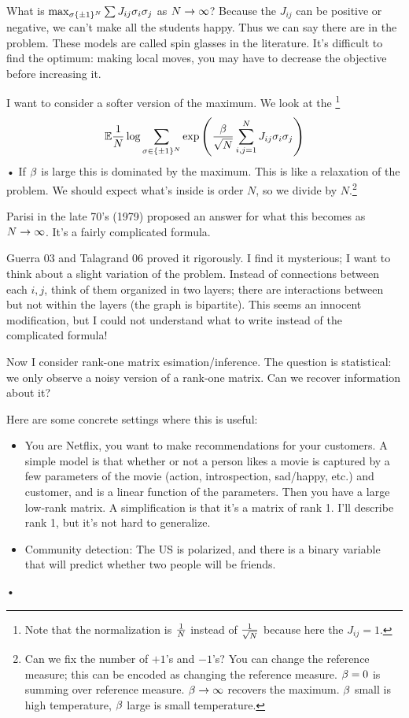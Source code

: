 What is $\max_{\sigma\{\pm 1\}^N} \sum J_{ij}\sigma_i\sigma_j$ as $N\to \infty$?
Because the $J_{ij}$ can be positive or negative, we can't make all the students happy. Thus we can say there are  in the problem. These models are called spin glasses in the literature.
It's difficult to find the optimum: making local moves, you may have to decrease the objective before increasing it.

I want to consider a softer version of the maximum. We look at the \footnote{Note that the normalization is $\frac{1}{N}$ instead of $\frac{1}{\sqrt N}$ because here the $J_{ij}=1$.}
\begin{align*}
\mathbb{E} \frac{1}{N}\log \sum_{\sigma\in \{\pm 1\}^N}\exp\left( {
\frac{\beta}{\sqrt N}\sum_{i,j=1}^{N} J_{ij} \sigma_i\sigma_j
} \right)
\end{align*}•
If $\beta$ is large this is dominated by the maximum. 
This is like a relaxation of the problem. We should expect what's inside is order $N$, so we divide by $N$.\footnote{Can we fix the number of $+1$'s and $-1$'s? You can change the reference measure; this can be encoded as changing the reference measure.
$\beta=0$ is summing over reference measure. $\beta\to \infty$ recovers the maximum. $\beta$ small is high temperature, $\beta$ large is small temperature.}

Parisi in the late 70's (1979) proposed an answer for what this becomes as $N\to \infty$. It's a fairly complicated formula. 

Guerra 03 and Talagrand 06 proved it rigorously. I find it mysterious; I want to think about a slight variation of the problem. Instead of connections between each $i,j$, think of them organized in two layers; there are interactions between but not within the layers (the graph is bipartite). 
This seems an innocent modification, but I could not understand what to write instead of the complicated formula! %


Now I consider rank-one matrix esimation/inference. The question is statistical: we only observe a noisy version of a rank-one matrix. Can we recover information about it?

Here are some concrete settings where this is useful:
\begin{itemize}
\item
You are Netflix, you want to make recommendations for your customers. A simple model is that whether or not a person likes a movie is captured by a few parameters of the movie (action, introspection, sad/happy, etc.) and customer, and is a linear function of the parameters. Then you have a large low-rank matrix. A simplification is that it's a matrix of rank 1. I'll describe rank 1, but it's not hard to generalize. 
\item
Community detection: The US is polarized, and there is a binary variable that will predict whether two people will be friends.
\end{itemize}•

